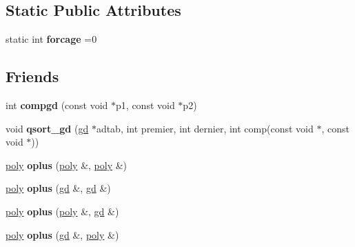 \subsection*{Static Public Attributes}
\begin{DoxyCompactItemize}
\item 
\mbox{\label{classmmgd_1_1poly_a4c658d3ff941048a220fe08f3bc2dfab}} 
static int {\bfseries forcage} =0
\end{DoxyCompactItemize}
\subsection*{Friends}
\begin{DoxyCompactItemize}
\item 
\mbox{\label{classmmgd_1_1poly_a902bbbf11a23a3fc4075dcd29e9ba0a3}} 
int {\bfseries compgd} (const void $\ast$p1, const void $\ast$p2)
\item 
\mbox{\label{classmmgd_1_1poly_a6e11338fa76cb7916e75802534f77587}} 
void {\bfseries qsort\+\_\+gd} (\mbox{\hyperlink{classmmgd_1_1gd}{gd}} $\ast$adtab, int premier, int dernier, int comp(const void $\ast$, const void $\ast$))
\item 
\mbox{\label{classmmgd_1_1poly_abcce92100cdf3208f275859d3908fbe6}} 
\mbox{\hyperlink{classmmgd_1_1poly}{poly}} {\bfseries oplus} (\mbox{\hyperlink{classmmgd_1_1poly}{poly}} \&, \mbox{\hyperlink{classmmgd_1_1poly}{poly}} \&)
\item 
\mbox{\label{classmmgd_1_1poly_a247e64e536c6f1a070bc8eb9d870058d}} 
\mbox{\hyperlink{classmmgd_1_1poly}{poly}} {\bfseries oplus} (\mbox{\hyperlink{classmmgd_1_1gd}{gd}} \&, \mbox{\hyperlink{classmmgd_1_1gd}{gd}} \&)
\item 
\mbox{\label{classmmgd_1_1poly_a8408c8cbe50239231608be92b6c8b47f}} 
\mbox{\hyperlink{classmmgd_1_1poly}{poly}} {\bfseries oplus} (\mbox{\hyperlink{classmmgd_1_1poly}{poly}} \&, \mbox{\hyperlink{classmmgd_1_1gd}{gd}} \&)
\item 
\mbox{\label{classmmgd_1_1poly_a7d137100cfb94e8231c00c253b1c0d45}} 
\mbox{\hyperlink{classmmgd_1_1poly}{poly}} {\bfseries oplus} (\mbox{\hyperlink{classmmgd_1_1gd}{gd}} \&, \mbox{\hyperlink{classmmgd_1_1poly}{poly}} \&)

\end{DoxyCompactItemize}
